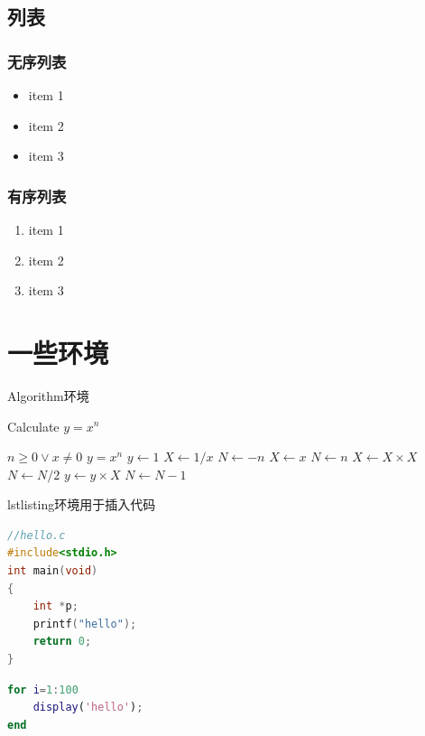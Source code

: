 \documentclass[bachelor]{XJTUthesis}
\begin{document}
\section{列表}
\subsection{无序列表}
\begin{itemize}
    \item item 1
    \item item 2
    \item item 3
\end{itemize}
\subsection{有序列表}
\begin{enumerate}
    \item item 1
    \item item 2
    \item item 3
\end{enumerate}

\chapter{一些环境}

Algorithm环境
\begin{algorithm}
    \caption{Calculate $y = x^n$}
    \label{alg1}
    \begin{algorithmic}
        \REQUIRE $n \geq 0 \vee x \neq 0$
        \ENSURE $y = x^n$
        \STATE $y \leftarrow 1$
        \STATE $X \leftarrow 1 / x$
        \STATE $N \leftarrow -n$
        \ELSE
        \STATE $X \leftarrow x$
        \STATE $N \leftarrow n$
        \ENDIF
        \STATE $X \leftarrow X \times X$
        \STATE $N \leftarrow N / 2$
        \ELSE[$N$ is odd]
        \STATE $y \leftarrow y \times X$
        \STATE $N \leftarrow N - 1$
        \ENDIF
        \ENDWHILE
    \end{algorithmic}
\end{algorithm}

lstlisting环境用于插入代码
\begin{lstlisting}[language=c++]
//hello.c
#include<stdio.h>
int main(void)
{
    int *p;
    printf("hello");
    return 0;
}
\end{lstlisting}

\begin{lstlisting}[language=matlab]
for i=1:100
    display('hello');
end
\end{lstlisting}
\end{document}
